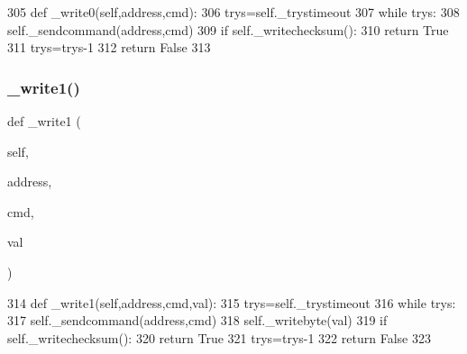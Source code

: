 \begin{DoxyCode}
305     \textcolor{keyword}{def }\_write0(self,address,cmd):
306         trys=self.\_trystimeout
307         \textcolor{keywordflow}{while} trys:
308             self.\_sendcommand(address,cmd)
309             \textcolor{keywordflow}{if} self.\_writechecksum():
310                 \textcolor{keywordflow}{return} \textcolor{keyword}{True}
311             trys=trys-1
312         \textcolor{keywordflow}{return} \textcolor{keyword}{False}
313 
\end{DoxyCode}
\mbox{\label{classtoxic__hardware_1_1roboclaw__3_1_1Roboclaw_a3a71ce5bc0ecf964d3b920c8bef96436}} 
\subsubsection{\texorpdfstring{\+\_\+write1()}{\_write1()}}
{\footnotesize\ttfamily def \+\_\+write1 (\begin{DoxyParamCaption}\item[{}]{self,  }\item[{}]{address,  }\item[{}]{cmd,  }\item[{}]{val }\end{DoxyParamCaption})\hspace{0.3cm}{\ttfamily [private]}}


\begin{DoxyCode}
314     \textcolor{keyword}{def }\_write1(self,address,cmd,val):
315         trys=self.\_trystimeout
316         \textcolor{keywordflow}{while} trys:
317             self.\_sendcommand(address,cmd)
318             self.\_writebyte(val)
319             \textcolor{keywordflow}{if} self.\_writechecksum():
320                 \textcolor{keywordflow}{return} \textcolor{keyword}{True}
321             trys=trys-1
322         \textcolor{keywordflow}{return} \textcolor{keyword}{False}
323 
\end{DoxyCode}
\mbox{\label{classtoxic__hardware_1_1roboclaw__3_1_1Roboclaw_a583baf56af1846dfe43c7b76ed20784c}} 

